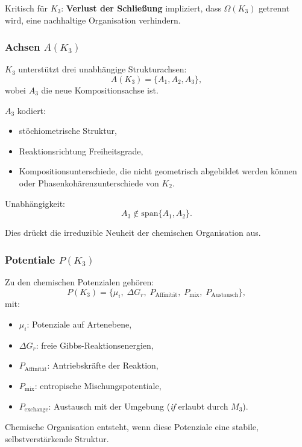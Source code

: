 Kritisch für $K_3$:
\textbf{Verlust der Schließung} impliziert, dass $\Omega(K_3)$ getrennt wird,
eine nachhaltige Organisation verhindern.

\subsubsection{Achsen \texorpdfstring{$A(K_3)$}{A(K_3)}}

$K_3$ unterstützt drei unabhängige Strukturachsen:
\[
A(K_3) = \{A_1, A_2, A_3\},
\]
wobei $A_3$ die neue Kompositionsachse ist.

$A_3$ kodiert:
\begin{itemize}
    \item stöchiometrische Struktur,
    \item Reaktionsrichtung Freiheitsgrade,
    \item Kompositionsunterschiede, die nicht geometrisch abgebildet werden können
          oder Phasenkohärenzunterschiede von $K_2$.
\end{itemize}

Unabhängigkeit:
\[
A_3 \notin \mathrm{span}\{A_1,A_2\}.
\]

Dies drückt die irreduzible Neuheit der chemischen Organisation aus.

\subsubsection{Potentiale \texorpdfstring{$P(K_3)$}{P(K_3)}}

Zu den chemischen Potenzialen gehören:
\[
P(K_3) = \{ \mu_i,\; \Delta G_r,\; P_{\mathrm{Affinität}},\;
           P_{\mathrm{mix}},\; P_{\mathrm{Austausch}}\},
\]
mit:
\begin{itemize}
    \item $\mu_i$: Potenziale auf Artenebene,
    \item $\Delta G_r$: freie Gibbs-Reaktionsenergien,
    \item $P_{\mathrm{Affinität}}$: Antriebskräfte der Reaktion,
    \item $P_{\mathrm{mix}}$: entropische Mischungspotentiale,
    \item $P_{\mathrm{exchange}}$: Austausch mit der Umgebung (\emph{if}
          erlaubt durch $M_3$).
\end{itemize}

Chemische Organisation entsteht, wenn diese Potenziale eine stabile,
selbstverstärkende Struktur.

